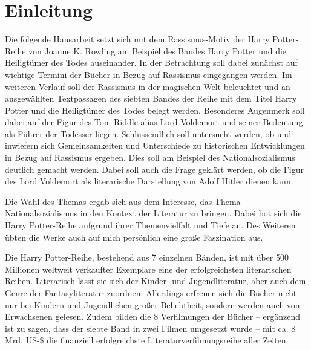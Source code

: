 \section{Einleitung} 
Die folgende Hausarbeit setzt sich mit dem Rassismus-Motiv der \glqq Harry Potter\grqq{}-Reihe von Joanne K. Rowling am Beispiel des Bandes \glqq Harry Potter und die Heiligtümer des Todes\grqq{} auseinander.
In der Betrachtung soll dabei zunächst auf wichtige Termini der Bücher in Bezug auf Rassismus eingegangen werden. 
Im weiteren Verlauf soll der Rassismus in der magischen Welt beleuchtet und an ausgewählten Textpassagen des siebten Bandes der Reihe mit dem Titel \glqq Harry Potter und die Heiligtümer des Todes\grqq{} belegt werden. 
Besonderes Augenmerk soll dabei auf der Figur des Tom Riddle alias Lord Voldemort und seiner Bedeutung als Führer der Todesser liegen.
Schlussendlich soll untersucht werden, ob und inwiefern sich Gemeinsamkeiten und Unterschiede zu historischen Entwicklungen in Bezug auf Rassismus ergeben. 
Dies soll am Beispiel des Nationalsozialismus deutlich gemacht werden. 
Dabei soll auch die Frage geklärt werden, ob die Figur des Lord Voldemort als  literarische Darstellung von Adolf Hitler dienen kann. 

Die Wahl des Themas ergab sich aus dem Interesse, das Thema \glqq Nationalsozialismus\grqq{} in den Kontext der Literatur zu bringen. 
Dabei bot sich die \glqq Harry Potter\grqq-Reihe aufgrund ihrer Themenvielfalt und Tiefe an. 
Des Weiteren übten die Werke auch auf mich persönlich eine große Faszination aus. 

Die \glqq Harry Potter\grqq-Reihe, bestehend aus 7 einzelnen Bänden, ist mit über 500 Millionen weltweit verkaufter Exemplare eine der erfolgreichsten literarischen Reihen. 
Literarisch lässt sie sich der Kinder- und Jugendliteratur, aber auch dem Genre der Fantasyliteratur zuordnen. 
Allerdings erfreuen sich die Bücher nicht nur bei Kindern und Jugendlichen großer Beliebtheit, sondern werden auch von Erwachsenen gelesen.
 Zudem bilden die 8 Verfilmungen der Bücher – ergänzend ist zu sagen, dass der siebte Band in zwei Filmen umgesetzt wurde – mit ca. 8 Mrd. US-\$ die finanziell erfolgreichste Literaturverfilmungsreihe aller Zeiten.

